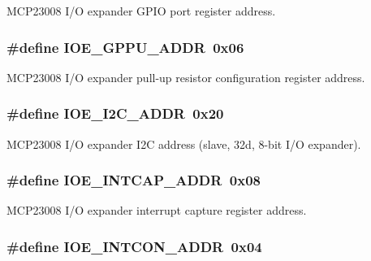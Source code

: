 M\-C\-P23008 I/\-O expander G\-P\-I\-O port register address. \hypertarget{a00007_a91e588d697383f94de2bf7f11d9ecb4b}{
\subsubsection[{I\-O\-E\-\_\-\-G\-P\-P\-U\-\_\-\-A\-D\-D\-R}]{\setlength{\rightskip}{0pt plus 5cm}\#define I\-O\-E\-\_\-\-G\-P\-P\-U\-\_\-\-A\-D\-D\-R~0x06}}\label{a00007_a91e588d697383f94de2bf7f11d9ecb4b}
M\-C\-P23008 I/\-O expander pull-\/up resistor configuration register address. \hypertarget{a00007_ad615a329bea187ce779cf9930ba8a6fa}{
\subsubsection[{I\-O\-E\-\_\-\-I2\-C\-\_\-\-A\-D\-D\-R}]{\setlength{\rightskip}{0pt plus 5cm}\#define I\-O\-E\-\_\-\-I2\-C\-\_\-\-A\-D\-D\-R~0x20}}\label{a00007_ad615a329bea187ce779cf9930ba8a6fa}
M\-C\-P23008 I/\-O expander I2\-C address (slave, 32d, 8-\/bit I/\-O expander). \hypertarget{a00007_ac0afd8503a8584599cc81f3d9b0a04dc}{
\subsubsection[{I\-O\-E\-\_\-\-I\-N\-T\-C\-A\-P\-\_\-\-A\-D\-D\-R}]{\setlength{\rightskip}{0pt plus 5cm}\#define I\-O\-E\-\_\-\-I\-N\-T\-C\-A\-P\-\_\-\-A\-D\-D\-R~0x08}}\label{a00007_ac0afd8503a8584599cc81f3d9b0a04dc}
M\-C\-P23008 I/\-O expander interrupt capture register address. \hypertarget{a00007_a90945d9544eebc892154f1e0443b1407}{
\subsubsection[{I\-O\-E\-\_\-\-I\-N\-T\-C\-O\-N\-\_\-\-A\-D\-D\-R}]{\setlength{\rightskip}{0pt plus 5cm}\#define I\-O\-E\-\_\-\-I\-N\-T\-C\-O\-N\-\_\-\-A\-D\-D\-R~0x04}}\label{a00007_a90945d9544eebc892154f1e0443b1407}
